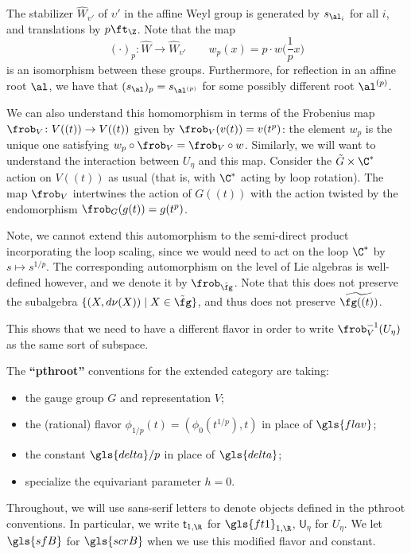 The
stabilizer $\widehat{W}_{\upsilon'}$ of $\upsilon'$ in the affine Weyl
group is generated by $s_{\al_i}$ for all $i$, and 
translations by $p \ft_{\Z}$.  Note that the map \[{(\cdot )}_p\colon \widehat{W}\to \widehat{W}_{\upsilon'} \qquad w_p(x)= p\cdot w\Big(\frac{1}{p}x\Big)\]
is an isomorphism between these groups.  Furthermore, for reflection
in an affine root $\al$, we have that $(s_\al)_p=s_{\al^{(p)}}$ for
some possibly different root $\al^{(p)}$.  

We can also understand this homomorphism in terms of the Frobenius map $\frob_V\colon V((t))\to V((t))$ given by $\frob_V(v(t))=v(t^p)$: the element $w_p$ is the unique one satisfying $w_p\circ \frob_V=\frob_V \circ w$.  Similarly, we will want to understand the interaction between $U_{\eta}$ and this map.  Consider the $\tilde{G}\times \C^*$ action on $V((t))$ as usual (that is, with $\C^*$ acting by loop rotation).  The map $\frob_V$ intertwines the action of 
$G((t))$ with the action twisted by the endomorphism $\frob_G(g(t))=g(t^p)$.

Note, we cannot extend this automorphism to the semi-direct product incorporating the loop scaling, since we would need to act on the loop $\C^*$ by $s\mapsto s^{1/p}$.  The corresponding automorphism on the level of Lie algebras is well-defined however, and we denote it by $\frob_{\tilde{\fg}}$.   Note that this does not preserve the subalgebra $\{(X,d\nu(X))\mid X\in \tilde{\fg}\}$, and thus does not preserve $\widetilde{\fg((t))}$. 

This shows that we need to have a different flavor in order to write $\frob_V^{-1}(U_\eta)$ as the same sort of subspace.  
\begin{definition}\label{def:pth-root}
  The {\bf ``\gls{pthroot}''} conventions for the extended category are taking:
  \begin{itemize}
    \item the gauge group $G$ and representation $V$;
      \item the (rational) flavor $\phi_{1/p}(t)=(\phi_0(t^{1/p}),t)$ in place of $\gls{flav}$;
      \item the constant $\gls{delta}/p$ in place of $\gls{delta}$;
      \item specialize the equivariant parameter $h=0$.
  \end{itemize}
  Throughout, we will use sans-serif letters to denote objects defined
  in the \gls{pthroot} conventions. In particular, we write
  $\mathsf{t}_{1,\R}$ for  $\gls{ft1}_{1,\R}$,  $\mathsf{U}_\eta$ for
  $U_{\eta}$.  We let $\gls{sfB}$ for $\gls{scrB}$ when we use this
  modified flavor and constant. 
\end{definition}

